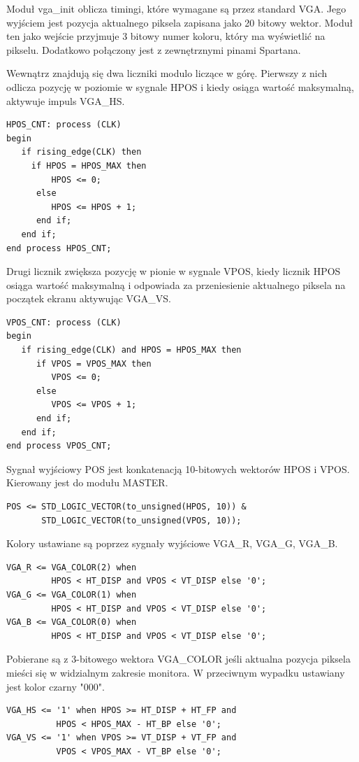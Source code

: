 \documentclass[11pt]{article}
\begin{document}
Moduł vga\_init oblicza timingi, które wymagane są przez standard VGA.
Jego wyjściem jest pozycja aktualnego piksela zapisana jako 20 bitowy wektor.
Moduł ten jako wejście przyjmuje 3 bitowy numer koloru, który ma wyświetlić na pikselu.
Dodatkowo połączony jest z zewnętrznymi pinami Spartana.

Wewnątrz znajdują się dwa liczniki modulo liczące w górę.
Pierwszy z nich odlicza pozycję w poziomie w sygnale HPOS i kiedy osiąga wartość maksymalną, aktywuje impuls VGA\_HS.
\begin{lstlisting}
HPOS_CNT: process (CLK) 
begin
   if rising_edge(CLK) then
     if HPOS = HPOS_MAX then
         HPOS <= 0;
      else
         HPOS <= HPOS + 1;
      end if;
   end if;
end process HPOS_CNT;
\end{lstlisting}
Drugi licznik zwiększa pozycję w pionie w sygnale VPOS, kiedy licznik HPOS osiąga wartość maksymalną i odpowiada za przeniesienie aktualnego piksela na początek ekranu aktywując VGA\_VS.
\begin{lstlisting}
VPOS_CNT: process (CLK) 
begin
   if rising_edge(CLK) and HPOS = HPOS_MAX then
      if VPOS = VPOS_MAX then
         VPOS <= 0;
      else
         VPOS <= VPOS + 1;
      end if;
   end if;
end process VPOS_CNT;
\end{lstlisting}

Sygnał wyjściowy POS jest konkatenacją 10-bitowych wektorów HPOS i VPOS. 
Kierowany jest do modułu MASTER.
\begin{lstlisting}
POS <= STD_LOGIC_VECTOR(to_unsigned(HPOS, 10)) &
       STD_LOGIC_VECTOR(to_unsigned(VPOS, 10));
\end{lstlisting}


Kolory ustawiane są poprzez sygnały wyjściowe VGA\_R, VGA\_G, VGA\_B.
\begin{lstlisting}
VGA_R <= VGA_COLOR(2) when
         HPOS < HT_DISP and VPOS < VT_DISP else '0';
VGA_G <= VGA_COLOR(1) when
         HPOS < HT_DISP and VPOS < VT_DISP else '0';
VGA_B <= VGA_COLOR(0) when
         HPOS < HT_DISP and VPOS < VT_DISP else '0';
\end{lstlisting}
Pobierane są z 3-bitowego wektora VGA\_COLOR jeśli aktualna pozycja piksela mieści się w widzialnym zakresie monitora.
W przeciwnym wypadku ustawiany jest kolor czarny "000".
\begin{lstlisting}
VGA_HS <= '1' when HPOS >= HT_DISP + HT_FP and
          HPOS < HPOS_MAX - HT_BP else '0';
VGA_VS <= '1' when VPOS >= VT_DISP + VT_FP and
          VPOS < VPOS_MAX - VT_BP else '0';
\end{lstlisting}
\end{document}
